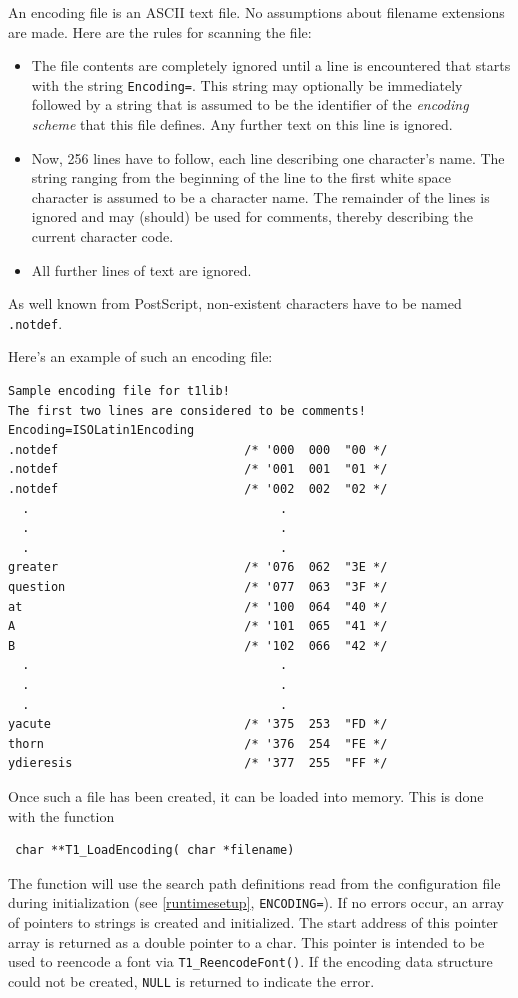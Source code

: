 An encoding file is an ASCII text file. No
assumptions about filename extensions are made. Here are the rules for
scanning the file:
\begin{itemize}
\item The file contents are completely ignored until a line is encountered
  that starts with the string \verb+Encoding=+. This string may optionally be
  immediately followed by a string that is assumed to be the identifier of the
  {\em encoding scheme} that this file defines. Any further text on this line
  is ignored.
\item Now, 256 lines have to follow, each line describing one
  character's name. The string ranging from the beginning of the line
  to the first white space character is assumed to be a character
  name. The remainder of the lines is ignored and may (should) be used
  for comments, thereby describing the current character code.
\item All further lines of text are ignored.
\end{itemize}
As well known from PostScript, non-existent characters have to be
named \verb+.notdef+.

Here's an example of such an encoding file:
\begin{verbatim}
Sample encoding file for t1lib!
The first two lines are considered to be comments!
Encoding=ISOLatin1Encoding       
.notdef                          /* '000  000  "00 */ 
.notdef                          /* '001  001  "01 */ 
.notdef                          /* '002  002  "02 */ 
  .                                   .
  .                                   .
  .                                   .
greater                          /* '076  062  "3E */
question                         /* '077  063  "3F */
at                               /* '100  064  "40 */
A                                /* '101  065  "41 */
B                                /* '102  066  "42 */
  .                                   .
  .                                   .
  .                                   .
yacute                           /* '375  253  "FD */
thorn                            /* '376  254  "FE */
ydieresis                        /* '377  255  "FF */ 
\end{verbatim}
Once such a file has been created, it can be loaded into memory. This
is done with the function
\precorr
\begin{verbatim}
 char **T1_LoadEncoding( char *filename)
\end{verbatim}\postcorr
The function will use the search path definitions read from
the configuration file during initialization (see
\ref{runtimesetup}, \verb+ENCODING=+). If no
errors occur, an array of pointers to strings is created and
initialized. The start address of this pointer array is returned as a
double pointer to a char. This pointer is intended
to be used to reencode a font via \verb+T1_ReencodeFont()+. If the encoding
data structure could not be created, \verb+NULL+ is returned to indicate the
error. 


